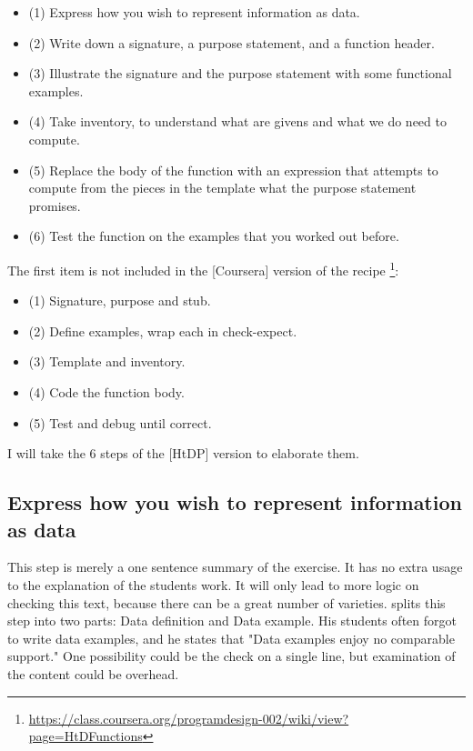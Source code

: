 \begin{itemize}
 \item (1) Express how you wish to represent information as data.
 \item (2) Write down a signature, a purpose statement, and a function header.
 \item (3) Illustrate the signature and the purpose statement with some functional examples.
 \item (4) Take inventory, to understand what are givens and what we do need to compute.
 \item (5) Replace the body of the function with an expression that attempts to compute from the pieces in the template what the purpose statement promises.
 \item (6) Test the function on the examples that you worked out before.
\end{itemize}
 
 The first item is not included in the [Coursera] version of the recipe
 \footnote{\url{https://class.coursera.org/programdesign-002/wiki/view?page=HtDFunctions}}:
 
\begin{itemize}
  \item (1) Signature, purpose and stub.
  \item (2) Define examples, wrap each in check-expect.
  \item (3) Template and inventory.
  \item (4) Code the function body.
  \item (5) Test and debug until correct.
\end{itemize}

I will take the 6 steps of the [HtDP] version to elaborate them.

\subsection{Express how you wish to represent information as data}
This step is merely a one sentence summary of the exercise. It has no
extra usage to the explanation of the students work. It will only lead to more
logic on checking this text, because there can be a great number of varieties.
\citet{Ramsey:2014TDP} splits this step into two parts: Data definition and Data example.
His students often forgot to write data examples, and he states that
"Data examples enjoy no comparable support."
One possibility could be the check on a single line, but examination of the
content could be overhead.


